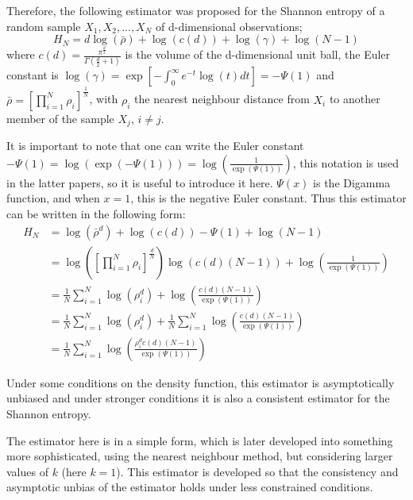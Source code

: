 \documentclass[12pt]{report}
\begin{document}
Therefore, the following estimator was proposed for the Shannon entropy of a random sample $X_{1}, X_{2}, ..., X_{N}$ of d-dimensional observations;
\begin{equation}
H_{N} = d \log(\bar{\rho } ) + \log (c(d)) + \log (\gamma) + \log (N-1)
\end{equation}
where $c(d) = \frac{\pi^{\frac{d}{2}}}{\Gamma ( \frac{d}{2} + 1 )}$ is the volume of the d-dimensional unit ball, the Euler constant is $\log (\gamma) = \exp \left[ - \int_{0}^{\infty} e^{-t} \log(t) dt \right] = -\Psi(1)$ and $\bar{\rho} = \left[ \prod_{i=1}^{N} \rho_{i} \right]^{\frac{1}{N}}$, with $\rho_{i}$ the nearest neighbour distance from $X_{i}$ to another member of the sample $X_{j}$, $i \neq j$. 

It is important to note that one can write the Euler constant $-\Psi(1) = \log (\exp(-\Psi(1))) = \log (\frac{1}{\exp(\Psi(1))})$, this notation is used in the latter papers, so it is useful to introduce it here. $\Psi(x)$ is the Digamma function, and when $x=1$, this is the negative Euler constant. Thus this estimator can be written in the following form:
\begin{align}
H_{N} &= \log(\bar{\rho}^{d} ) + \log (c(d)) - \Psi(1)  + \log (N-1) \nonumber \\
&= \log \left( \left[ \prod_{i=1}^{N} \rho_{i} \right]^{\frac{d}{N}} \right) \log( c(d) (N-1)) + \log \left(\frac{1}{\exp(\Psi(1))}\right) \nonumber \\
&= \frac{1}{N} \sum_{i=1}^{N} \log( \rho_{i}^{d} ) + \log \left( \frac{c(d) (N-1)}{ \exp(\Psi(1))} \right) \nonumber \\
&= \frac{1}{N} \sum_{i=1}^{N}\log(\rho_{i}^{d}) + \frac{1}{N} \sum_{i=1}^{N} \log \left( \frac{c(d) (N-1)}{\exp(\Psi(1))}\right) \nonumber \\
&= \frac{1}{N} \sum_{i=1}^{N} \log \left( \frac{\rho_{i}^{d} c(d) (N-1)}{\exp(\Psi(1))}\right) \label{Est_k=1}
\end{align}

Under some conditions on the density function, this estimator is asymptotically unbiased and under stronger conditions it is also a consistent estimator for the Shannon entropy. 

The estimator here is in a simple form, which is later developed into something more sophisticated, using the nearest neighbour method, but considering larger values of $k$ (here $k=1$). This estimator is developed so that the consistency and asymptotic unbias of the estimator holds under less constrained conditions.
\end{document}
